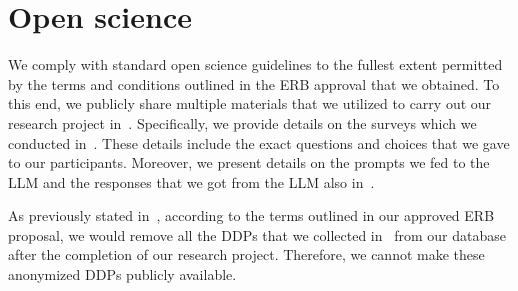 \section{Open science}
\label{sec:open_science}

We comply with standard open science guidelines to the fullest extent permitted by the terms and conditions outlined in the ERB approval that we obtained.
To this end, we publicly share multiple materials that we utilized to carry out our research project in~.
Specifically, we provide details on the surveys which we conducted in~.
These details include the exact questions and choices that we gave to our participants.
Moreover, we present details on the prompts we fed to the LLM and the responses that we got from the LLM also in~.

As previously stated in~, according to the terms outlined in our approved ERB proposal, we would remove all the DDPs that we collected in~ from our database after the completion of our research project.
Therefore, we cannot make these anonymized DDPs publicly available.